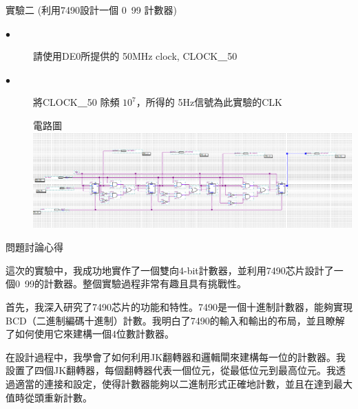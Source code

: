\documentclass[12pt, a4paper]{article}
\begin{document}
\begin{description}
\begin{description}
          \fontsize{20pt}{22pt}\selectfont
          \item 實驗二 (利用7490設計一個 0~99 計數器)
            \fontsize{16pt}{18pt}\selectfont
              \begin{description}
                \item [$\bullet$]請使用DE0所提供的 50MHz clock, CLOCK＿50
                \item [$\bullet$] 將CLOCK＿50 除頻 $10^7$，所得的 5Hz信號為此實驗的CLK\\
                \fontsize{18pt}{20pt}
                  \item []電路圖 \\[.3cm]
                    \includegraphics[width=13cm]{./image/ex1.png}
              \end{description}
            \normalsize
        \normalsize
      \end{description}
    \item [三、]問題討論心得 \\[.6cm]
      \begin{minipage}[t]{\linewidth}
        \fontsize{16}{18}\selectfont
        這次的實驗中，我成功地實作了一個雙向4-bit計數器，並利用7490芯片設計了一個0~99的計數器。整個實驗過程非常有趣且具有挑戰性。

        首先，我深入研究了7490芯片的功能和特性。7490是一個十進制計數器，能夠實現BCD（二進制編碼十進制）計數。我明白了7490的輸入和輸出的布局，並且瞭解了如何使用它來建構一個4位數計數器。
        
        在設計過程中，我學會了如何利用JK翻轉器和邏輯閘來建構每一位的計數器。我設置了四個JK翻轉器，每個翻轉器代表一個位元，從最低位元到最高位元。我透過適當的連接和設定，使得計數器能夠以二進制形式正確地計數，並且在達到最大值時從頭重新計數。
        \normalsize  
      \end{minipage}
  \normalsize
\end{description}
\end{document}
